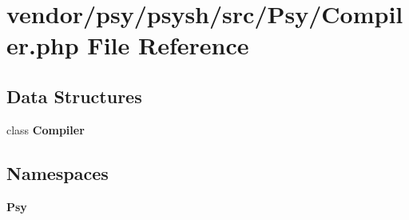 \section{vendor/psy/psysh/src/\+Psy/\+Compiler.php File Reference}
\label{psy_2psysh_2src_2_psy_2_compiler_8php}
\subsection*{Data Structures}
\begin{DoxyCompactItemize}
\item 
class {\bf Compiler}
\end{DoxyCompactItemize}
\subsection*{Namespaces}
\begin{DoxyCompactItemize}
\item 
 {\bf Psy}
\end{DoxyCompactItemize}

